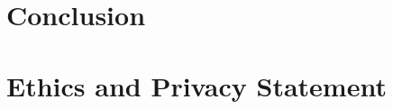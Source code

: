 \documentclass[manuscript,screen,review]{acmart}
\begin{document}
\section{Conclusion}
\label{sec:conclusion}

\begin{acks}

\end{acks}

\section*{Ethics and Privacy Statement}




\appendix

\section{}
\label{app:1}

\subsection{}
\label{app:1.1}
\end{document}

